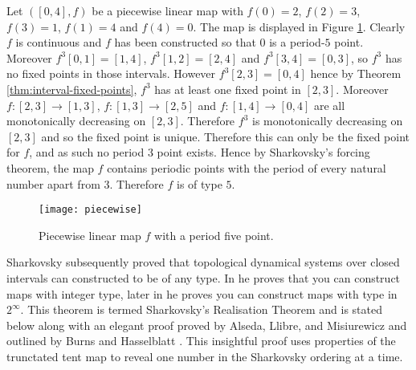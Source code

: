 \begin{exmp} \label{exmp:piecewise-sharkovsky}
    Let $([0, 4], f)$ be a piecewise linear map with $f(0) = 2$, $f(2) = 3$, $f(3) = 1$, $f(1) = 4$ and $f(4) = 0$. The map is displayed in Figure \ref{fig:piecewise_linear}. Clearly $f$ is continuous and $f$ has been constructed so that $0$ is a period-$5$ point. Moreover $f^3[0, 1] = [1, 4]$, $f^3[1, 2] = [2, 4]$ and $f^3[3, 4] = [0, 3]$, so $f^3$ has no fixed points in those intervals. However $f^3[2, 3] = [0, 4]$ hence by Theorem \ref{thm:interval-fixed-points}, $f^3$ has at least one fixed point in $[2, 3]$. Moreover $f: [2, 3] \to [1, 3]$, $f: [1, 3] \to [2, 5]$ and $f: [1, 4] \to [0, 4]$ are all monotonically decreasing on $[2, 3]$. Therefore $f^3$ is monotonically decreasing on $[2, 3]$ and so the fixed point is unique. Therefore this can only be the fixed point for $f$, and as such no period 3 point exists. Hence by Sharkovsky's forcing theorem, the map $f$ contains periodic points with the period of every natural number apart from 3. Therefore $f$ is of type $5$.

    \begin{figure}[h]
        \centering
        \texttt{[image: piecewise]}
        \caption{Piecewise linear map $f$ with a period five point.}
        \label{fig:piecewise_linear}
    \end{figure}

\end{exmp}

Sharkovsky subsequently proved that topological dynamical systems over closed intervals can constructed to be of any type. In \cite{sharkovsky} he proves that you can construct maps with integer type, later in \cite{sharkovsky2} he proves you can construct maps with type in $2^\infty$. This theorem is termed Sharkovsky's Realisation Theorem and is stated below along with an elegant proof proved by Alseda, Llibre, and Misiurewicz \cite[\S 2.2]{alm} and outlined by Burns and Hasselblatt \cite[\S 7]{burns-hasselblatt}. This insightful proof uses properties of the trunctated tent map to reveal one number in the Sharkovsky ordering at a time.

